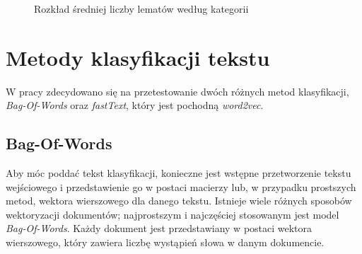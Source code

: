 \begin{figure}[ht!]
	\centering
    \qquad
	\caption{Rozkład średniej liczby lematów według kategorii}
   \label{fig:rozklad-lemmatow-wg-zrodla}
\end{figure}
\newpage
\section{Metody klasyfikacji tekstu}
W pracy zdecydowano się na przetestowanie dwóch różnych metod klasyfikacji, \textit{Bag-Of-Words} oraz \textit{fastText}, który jest pochodną \textit{word2vec}.
\subsection{Bag-Of-Words}
Aby móc poddać tekst klasyfikacji, konieczne jest wstępne przetworzenie tekstu wejściowego i przedstawienie go w postaci macierzy lub, w przypadku prostszych metod, wektora wierszowego dla danego tekstu. Istnieje wiele różnych sposobów wektoryzacji dokumentów; najprostszym i najczęściej stosowanym \cite{BoulisText} jest model \textit{Bag-Of-Words}. Każdy dokument jest przedstawiany w postaci wektora wierszowego, który zawiera liczbę wystąpień słowa w danym dokumencie.\cite{joulin2016bag}
